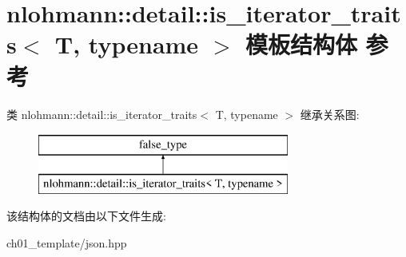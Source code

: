 \hypertarget{structnlohmann_1_1detail_1_1is__iterator__traits}{}\section{nlohmann\+::detail\+::is\+\_\+iterator\+\_\+traits$<$ T, typename $>$ 模板结构体 参考}
\label{structnlohmann_1_1detail_1_1is__iterator__traits}
类 nlohmann\+::detail\+::is\+\_\+iterator\+\_\+traits$<$ T, typename $>$ 继承关系图\+:\begin{figure}[H]
\begin{center}
\leavevmode
\includegraphics[height=2.000000cm]{structnlohmann_1_1detail_1_1is__iterator__traits}
\end{center}
\end{figure}


该结构体的文档由以下文件生成\+:\begin{DoxyCompactItemize}
\item 
ch01\+\_\+template/json.\+hpp\end{DoxyCompactItemize}
